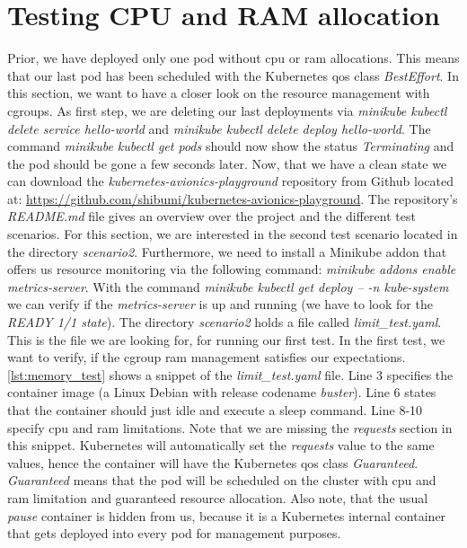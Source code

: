 \documentclass[titlepage]{report}
\begin{document}
\section{Testing CPU and RAM allocation}
Prior, we have deployed only one pod without \gls{cpu} or \gls{ram} allocations. This means that our last pod has been scheduled with the Kubernetes \gls{qos} class \emph{BestEffort}.
In this section, we want to have a closer look on the resource management with \glspl{cgroup}. As first step, we are deleting our last deployments via \emph{minikube kubectl delete service hello-world} and \emph{minikube kubectl delete deploy hello-world}.
The command \emph{minikube kubectl get pods} should now show the status \emph{Terminating} and the pod should be gone a few seconds later. Now, that we have a clean state we can
download the \emph{kubernetes-avionics-playground} repository from Github located at: \href{https://github.com/shibumi/kubernetes-avionics-playground}{https://github.com/shibumi/kubernetes-avionics-playground}.
The repository's \emph{README.md} file gives an overview over the project and the different test scenarios. For this section, we are interested in the second test scenario located in the directory \emph{scenario2}.
Furthermore, we need to install a Minikube addon that offers us resource monitoring via the following command: \emph{minikube addons enable metrics-server}. With the command \emph{minikube kubectl get deploy -- -n kube-system}
we can verify if the \emph{metrics-server} is up and running (we have to look for the \emph{READY 1/1 state}). The directory \emph{scenario2} holds a file called \emph{limit\_test.yaml}. This is the file we are looking for,
for running our first test. In the first test, we want to verify, if the cgroup \gls{ram} management satisfies our expectations. \autoref{lst:memory_test} shows a snippet of the \emph{limit\_test.yaml} file. Line 3
specifies the container image (a Linux Debian with release codename \emph{buster}). Line 6 states that the container should just idle and execute a sleep command. Line 8-10 specify \gls{cpu} and \gls{ram} limitations.
Note that we are missing the \emph{requests} section in this snippet. Kubernetes will automatically set the \emph{requests} value to the same values, hence the container will have the Kubernetes \gls{qos} class \emph{Guaranteed}. 
\emph{Guaranteed} means that the pod will be scheduled on the cluster with \gls{cpu} and \gls{ram} limitation and guaranteed resource allocation. 
Also note, that the usual \emph{pause} container is hidden from us, because it is a Kubernetes internal container that gets deployed into every pod for management purposes.
\end{document}
